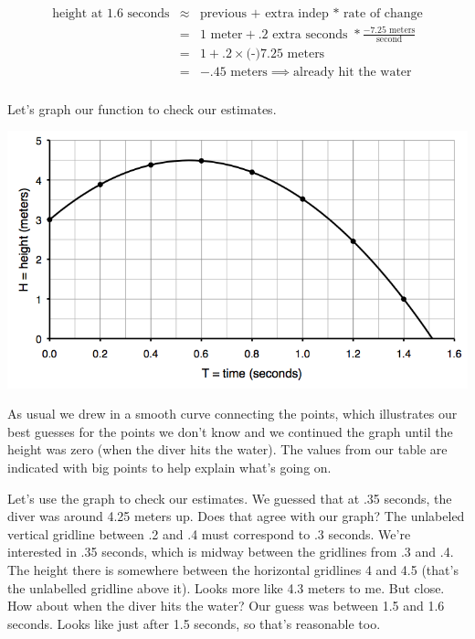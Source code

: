 \vspace{-.5in}  %

\begin{eqnarray} \nonumber
\text{height at 1.6 seconds} & \approx & \text{previous + extra indep } \ast \text{ rate of change}  \\ \nonumber
& = &  1 \text{ meter} + .2\text{ extra seconds } \ast \frac{-7.25 \text{ meters}} {\text{second}} \\ \nonumber
&=& 1+.2 \times \text{(-)}7.25 \text{ meters} \\ \nonumber
&=& -.45 \text{ meters} \implies \text{already hit the water} \\ \nonumber
\end{eqnarray}

Let's graph our function to check our estimates.
\begin{center}
 {\includegraphics [width = 6in] {springboard_diver.png}}
\end{center}
As usual we drew in a smooth curve connecting the points, which illustrates our best guesses for the points we don't know and we continued the graph until the height was zero (when the diver hits the water).  The values from our table are indicated with big points to help explain what's going on.     

Let's use the graph to check our estimates.  We guessed that at .35 seconds, the diver was around 4.25 meters up. Does that agree with our graph?  The unlabeled vertical gridline between .2 and .4 must correspond to .3 seconds.  We're interested in .35 seconds, which is midway between the gridlines from .3 and .4.  The height there is somewhere between the horizontal gridlines 4 and 4.5 (that's the unlabelled gridline above it).   Looks more like 4.3 meters to me.  But close.  How about when the diver hits the water?  Our guess was between 1.5 and 1.6 seconds.  Looks like just after 1.5 seconds, so that's reasonable too.

